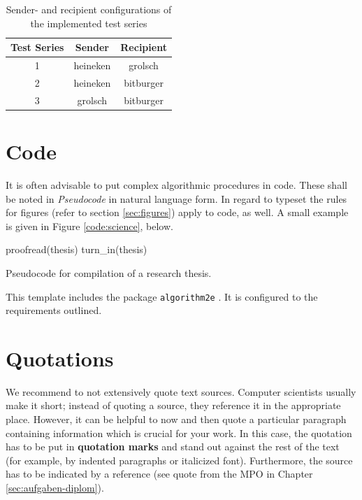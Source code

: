 \begin{table}
  \renewcommand{\arraystretch}{1.5} 
  \begin{center}
    \caption{Sender- and recipient configurations of the implemented test series}
    \begin{tabular}{|c|c|c|}
      \hline
      \textbf{Test Series} & \textbf{Sender} & \textbf{Recipient} \\
      \hline
      1 & heineken & grolsch \\
      \hline
      2 & heineken & bitburger  \\
      \hline
      3 & grolsch & bitburger \\
      \hline
    \end{tabular}
    \label{tab:config}
  \end{center}
\end{table}


\section{Code}
\label{sec:code}
It is often advisable to put complex algorithmic procedures in code.
These shall be noted in \emph{Pseudocode} in natural language form.
In regard to typeset the rules for figures (refer to section \ref{sec:figures}) apply to code, as well.
A small example is given in Figure \ref{code:science}, below.

\begin{algorithm}

  proofread(thesis)\;
  turn\_in(thesis)\;

  \caption{Pseudocode for compilation of a research thesis.}
  \label{code:science}
\end{algorithm}

This template includes the package \texttt{algorithm2e} \cite{pkg:algorithm2e}.
It is configured to the requirements outlined.

\section{Quotations}
\label{sec:quotations}
We recommend to not extensively quote text sources. Computer scientists usually make it short; instead of quoting a source, they reference it in the appropriate place. However, it can be helpful to now and then quote a particular paragraph containing information which is crucial for your work. In this case, the quotation has to be put in \textbf{quotation marks} and stand out against the rest of the text (for example, by indented paragraphs or italicized font). Furthermore, the source has to be indicated by a reference (see quote from the MPO in Chapter
\ref{sec:aufgaben-diplom}).

